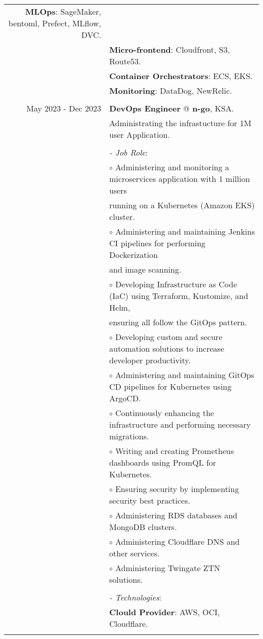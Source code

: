 \documentclass[a4paper,10pt]{article}
\begin{document}
\begin{longtable}{r|l}
    \textbf{MLOps}: SageMaker, bentoml, Prefect, MLflow, DVC. \\&
    \textbf{Micro-frontend}: Cloudfront, S3, Route53. \\&
    \textbf{Container Orchestrators}: ECS, EKS. \\&
    \textbf{Monitoring}: DataDog, NewRelic. \\&
    \\
    May 2023 - Dec 2023 & \textbf{DevOps Engineer} @
    \textbf{n-go}, KSA. \\&
    Administrating the infrastucture for 1M user Application. \\&
    \\&
    \textit{- Job Role}:\\&
    $\circ$ Administering and monitoring a microservices application with 1 million users \\ & 
    running on a Kubernetes (Amazon EKS) cluster. \\ &
    $\circ$ Administering and maintaining Jenkins CI pipelines for performing Dockerization \\ &
    and image scanning. \\ &
    $\circ$ Developing Infrastructure as Code (IaC) using Terraform, Kustomize, and Helm, \\ & 
    ensuring all follow the GitOps pattern. \\ &
    $\circ$ Developing custom and secure automation solutions to increase developer productivity. \\ &
    $\circ$ Administering and maintaining GitOps CD pipelines for Kubernetes using ArgoCD. \\ &
    $\circ$ Continuously enhancing the infrastructure and performing necessary migrations. \\ &
    $\circ$ Writing and creating Prometheus dashboards using PromQL for Kubernetes. \\ &
    $\circ$ Ensuring security by implementing security best practices. \\ &
    $\circ$ Administering RDS databases and MongoDB clusters. \\ &
    $\circ$ Administering Cloudflare DNS and other services. \\ &
    $\circ$ Administering Twingate ZTN solutions. \\ &
    \\&
    \textit{- Technologies}:\\&
    \textbf{Clould Provider}: AWS, OCI, Cloudflare. \\&

\end{longtable}
\end{document}
